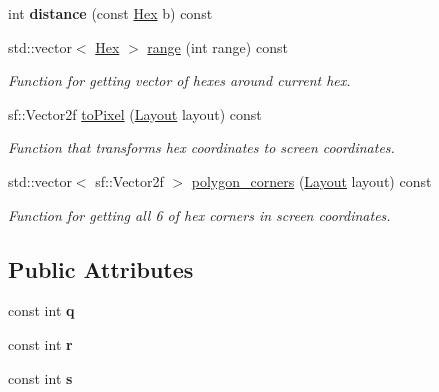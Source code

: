 \begin{DoxyCompactItemize}
\item 
int {\bfseries distance} (const \hyperlink{classHex}{Hex} b) const \hypertarget{classHex_a1826932dd063e77097b801485f67d5b0}{}\label{classHex_a1826932dd063e77097b801485f67d5b0}

\item 
std\+::vector$<$ \hyperlink{classHex}{Hex} $>$ \hyperlink{classHex_afb255b08e97fec5707089d529b65ae32}{range} (int range) const 
\begin{DoxyCompactList}\small\item\em Function for getting vector of hexes around current hex. \end{DoxyCompactList}\item 
sf\+::\+Vector2f \hyperlink{classHex_a9c4d119e6cc11eeacbf554811ccb19ee}{to\+Pixel} (\hyperlink{structLayout}{Layout} layout) const 
\begin{DoxyCompactList}\small\item\em Function that transforms hex coordinates to screen coordinates. \end{DoxyCompactList}\item 
std\+::vector$<$ sf\+::\+Vector2f $>$ \hyperlink{classHex_a56ee9508825a945bac8ea29802e578f4}{polygon\+\_\+corners} (\hyperlink{structLayout}{Layout} layout) const 
\begin{DoxyCompactList}\small\item\em Function for getting all 6 of hex corners in screen coordinates. \end{DoxyCompactList}\end{DoxyCompactItemize}
\subsection*{Public Attributes}
\begin{DoxyCompactItemize}
\item 
const int {\bfseries q}\hypertarget{classHex_ab1b70169be08ac771114d47dffe648de}{}\label{classHex_ab1b70169be08ac771114d47dffe648de}

\item 
const int {\bfseries r}\hypertarget{classHex_ad99466545613f1634c0819567d551353}{}\label{classHex_ad99466545613f1634c0819567d551353}

\item 
const int {\bfseries s}\hypertarget{classHex_af52636425c8cdb5cad6468985b75b699}{}\label{classHex_af52636425c8cdb5cad6468985b75b699}

\end{DoxyCompactItemize}
